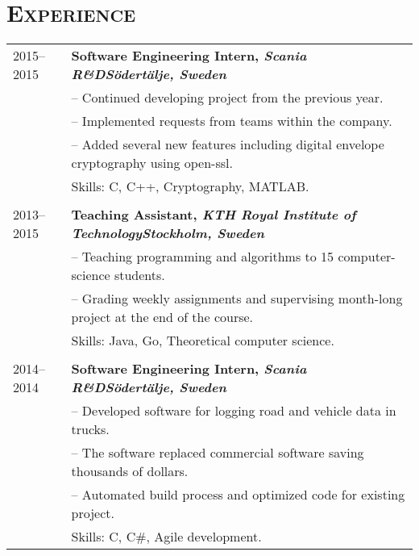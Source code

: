\documentclass[10.5pt]{article}
\newenvironment{sect}[1][]
{ \section*{\textsc{#1}} \noindent \begin{tabular}{p{5.3em} p{48em}} }
{ \end{tabular} }
\begin{document}
\begin{sect}[Experience]
  2015--2015&\textbf{Software Engineering Intern, \textit{Scania R\&D\hfill Södertälje, Sweden}}\\
  &-- Continued developing project from the previous year.\\
  &-- Implemented requests from teams within the company.\\
  &-- Added several new features including digital envelope cryptography using open-ssl.\\
  &Skills: C, C++, Cryptography, MATLAB. \\ \\
  2013--2015&\textbf{Teaching Assistant, \textit{KTH Royal Institute of Technology\hfill Stockholm, Sweden}}\\
  &-- Teaching programming and algorithms to 15 computer-science students.\\
  &-- Grading weekly assignments and supervising month-long project at the end of the course. \\
  &Skills: Java, Go, Theoretical computer science. \\ \\

  2014--2014&\textbf{Software Engineering Intern, \textit{Scania R\&D\hfill Södertälje, Sweden}}\\
  &-- Developed software for logging road and vehicle data in trucks.\\
  &-- The software replaced commercial software saving thousands of dollars.\\
  &-- Automated build process and optimized code for existing project. \\
  &Skills: C, C\#, Agile development. \\
\end{sect}
\end{document}
